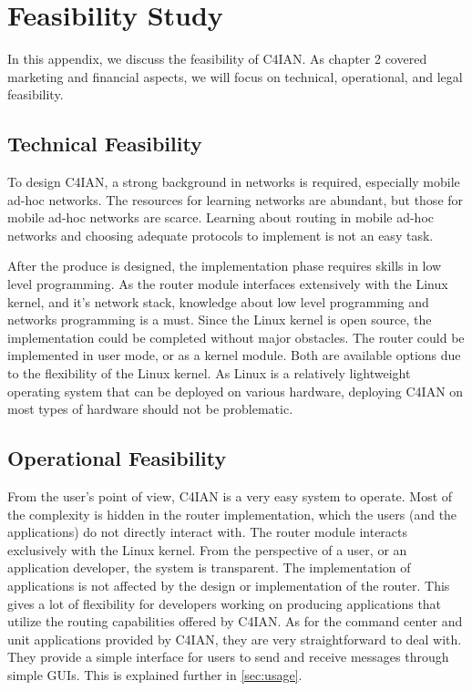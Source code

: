 \chapter{Feasibility Study}

\quad  In this appendix, we discuss the feasibility of C4IAN. As chapter 2 covered marketing and financial aspects, we will focus on technical, operational, and legal feasibility.

\section{Technical Feasibility}

\quad To design C4IAN, a strong background in networks is required, especially mobile ad-hoc networks. The resources for learning networks are abundant, but those for mobile ad-hoc networks are scarce. Learning about routing in mobile ad-hoc networks and choosing adequate protocols to implement is not an easy task.

After the produce is designed, the implementation phase requires skills in low level programming. As the router module interfaces extensively with the Linux kernel, and it's network stack, knowledge about low level programming and networks programming is a must. Since the Linux kernel is open source, the implementation could be completed without major obstacles. The router could be implemented in user mode, or as a kernel module. Both are available options due to the flexibility of the Linux kernel. As Linux is a relatively lightweight operating system that can be deployed on various hardware, deploying C4IAN on most types of hardware should not be problematic.

\section{Operational Feasibility}

\quad From the user's point of view, C4IAN is a very easy system to operate. Most of the complexity is hidden in the router implementation, which the users (and the applications) do not directly interact with. The router module interacts exclusively with the Linux kernel. From the perspective of a user, or an application developer, the system is transparent. The implementation of applications is not affected by the design or implementation of the router. This gives a lot of flexibility for developers working on producing applications that utilize the routing capabilities offered by C4IAN. As for the command center and unit applications provided by C4IAN, they are very straightforward to deal with. They provide a simple interface for users to send and receive messages through simple GUIs. This is explained further in \ref{sec:usage}.

